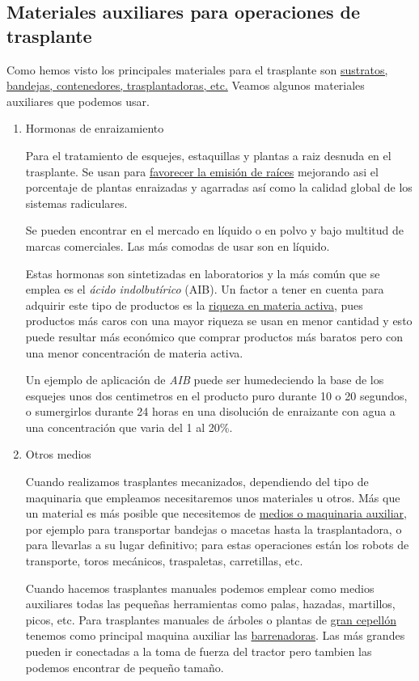 \documentclass[a4paper,12pt,oneside]{article}
\begin{document}
\subsection{Materiales auxiliares para operaciones de trasplante}
\label{sec:orgcb1b719}

Como  hemos visto los principales materiales para el trasplante son
\uline{sustratos, bandejas, contenedores, trasplantadoras, etc.} Veamos algunos
materiales auxiliares que podemos usar.

\begin{enumerate}
\item Hormonas de enraizamiento
\label{sec:org27c2123}

Para el tratamiento de esquejes, estaquillas y plantas a raiz desnuda en el
trasplante. Se usan para \uline{favorecer la emisión de raíces} mejorando asi el
porcentaje de plantas enraizadas y agarradas así como la calidad global de los
sistemas radiculares.

Se pueden encontrar en el mercado en líquido o en polvo y bajo multitud de
marcas comerciales. Las más comodas de usar son en líquido.

Estas hormonas son sintetizadas en laboratorios y la más común que se emplea es
el \emph{ácido indolbutírico} (AIB). Un factor a tener en cuenta para adquirir este
tipo de productos es la \uline{riqueza en materia activa}, pues productos más caros
con una mayor riqueza se usan en menor cantidad y esto puede resultar más
económico que comprar productos más baratos pero con una menor concentración de
materia activa.

Un ejemplo de aplicación de \emph{AIB} puede ser humedeciendo la base de los
esquejes unos dos centimetros en el producto puro durante 10 o 20 segundos, o
sumergirlos durante 24 horas en una disolución de enraizante con agua a una
concentración que varia del 1 al 20\%.

\item Otros medios
\label{sec:org4a34d62}

Cuando realizamos trasplantes mecanizados, dependiendo del tipo de maquinaria
que empleamos necesitaremos unos materiales u otros. Más que un material es más
posible que necesitemos de \uline{medios o maquinaria auxiliar}, por ejemplo para
transportar bandejas o macetas hasta la trasplantadora, o para llevarlas a su
lugar definitivo; para estas operaciones están los robots de transporte, toros
mecánicos, traspaletas, carretillas, etc.

Cuando hacemos trasplantes manuales podemos emplear como medios auxiliares todas
las pequeñas herramientas como palas, hazadas, martillos, picos, etc. Para
trasplantes manuales de árboles o plantas de \uline{gran cepellón} tenemos como
principal  maquina auxiliar las \uline{barrenadoras}. Las más grandes pueden ir
conectadas a la toma de fuerza del tractor pero tambien las podemos encontrar de
pequeño tamaño.


\end{enumerate}
\end{document}
